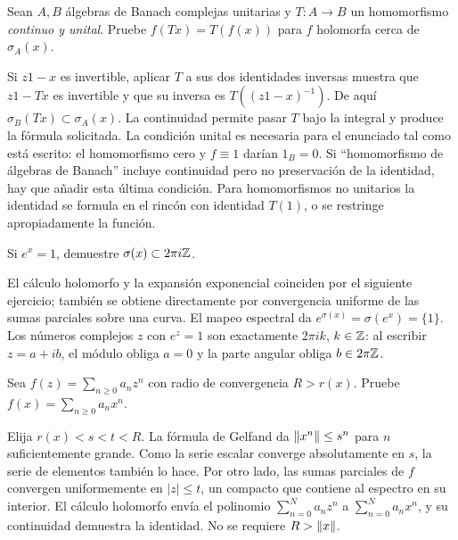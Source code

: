 \begin{ejercicio}\label{ej:v3-l23-3}
Sean $A,B$ álgebras de Banach complejas unitarias y $T:A\to B$ un homomorfismo \emph{continuo y unital}. Pruebe $f(Tx)=T(f(x))$ para $f$ holomorfa cerca de $\sigma_A(x)$.
\end{ejercicio}
\begin{solucion}
Si $z1-x$ es invertible, aplicar $T$ a sus dos identidades inversas muestra que $z1-Tx$ es invertible y que su inversa es $T((z1-x)^{-1})$. De aquí $\sigma_B(Tx)\subset\sigma_A(x)$. La continuidad permite pasar $T$ bajo la integral y produce la fórmula solicitada. La condición unital es necesaria para el enunciado tal como está escrito: el homomorfismo cero y $f\equiv1$ darían $1_B=0$. Si ``homomorfismo de álgebras de Banach'' incluye continuidad pero no preservación de la identidad, hay que añadir esta última condición. Para homomorfismos no unitarios la identidad se formula en el rincón con identidad $T(1)$, o se restringe apropiadamente la función.
\end{solucion}

\begin{ejercicio}\label{ej:v3-l23-4}
Si $e^x=1$, demuestre $\sigma(x)\subset2\pi i\mathbb Z$.
\end{ejercicio}
\begin{solucion}
El cálculo holomorfo y la expansión exponencial coinciden por el siguiente ejercicio; también se obtiene directamente por convergencia uniforme de las sumas parciales sobre una curva. El mapeo espectral da $e^{\sigma(x)}=\sigma(e^x)=\{1\}$. Los números complejos $z$ con $e^z=1$ son exactamente $2\pi ik$, $k\in\mathbb Z$: al escribir $z=a+ib$, el módulo obliga $a=0$ y la parte angular obliga $b\in2\pi\mathbb Z$.
\end{solucion}

\begin{ejercicio}\label{ej:v3-l23-5}
Sea $f(z)=\sum_{n\ge0}a_nz^n$ con radio de convergencia $R>r(x)$. Pruebe $f(x)=\sum_{n\ge0}a_nx^n$.
\end{ejercicio}
\begin{solucion}
Elija $r(x)<s<t<R$. La fórmula de Gelfand da $\left\lVert x^n\right\rVert\le s^n$ para $n$ suficientemente grande. Como la serie escalar converge absolutamente en $s$, la serie de elementos también lo hace. Por otro lado, las sumas parciales de $f$ convergen uniformemente en $|z|\le t$, un compacto que contiene al espectro en su interior. El cálculo holomorfo envía el polinomio $\sum_{n=0}^Na_nz^n$ a $\sum_{n=0}^Na_nx^n$, y su continuidad demuestra la identidad. No se requiere $R>\left\lVert x\right\rVert$.
\end{solucion}

